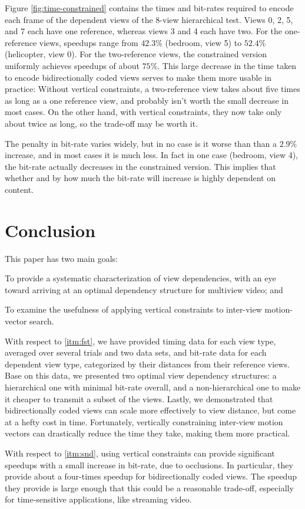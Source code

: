 \documentclass{sig-alternate-05-2015}
\begin{document}
Figure \ref{fig:time-constrained} contains the times and bit-rates required
to encode each frame of the dependent views of the 8-view hierarchical test.
Views 0, 2, 5, and 7 each have one reference, whereas views 3 and 4 each have
two. For the one-reference views, speedups range from $42.3\%$ (bedroom, view
5) to $52.4\%$ (helicopter, view 0). For the two-reference views, the
constrained version uniformly achieves speedups of about $75\%$. This large
decrease in the time taken to encode bidirectionally coded views serves to
make them more usable in practice: Without vertical constraints, a
two-reference view takes about five times as long as a one reference view, and
probably isn't worth the small decrease in most cases. On the other hand, with
vertical constraints, they now take only about twice as long, so the trade-off
may be worth it.

The penalty in bit-rate varies widely, but in no case is it worse than than a
$2.9\%$ increase, and in most cases it is much less. In fact in one case
(bedroom, view 4), the bit-rate actually decreases in the constrained version.
This implies that whether and by how much the bit-rate will increase is highly
dependent on content.
   
\section{Conclusion} %
\label{sec:conclusion} %
This paper has two main goals: \begin{compactenum}
\item \label{itm:fst} To provide a systematic characterization of view
dependencies, with an eye toward arriving at an optimal dependency structure for
multiview video; and
\item \label{itm:snd} To examine the usefulness of applying vertical constraints
to inter-view motion-vector search. \end{compactenum}

With respect to \ref{itm:fst}, we have provided timing data for each view type,
averaged over several trials and two data sets, and bit-rate data for each
dependent view type, categorized by their distances from their reference views.
Base on this data, we presented two optimal view dependency structures: a
hierarchical one with minimal bit-rate overall, and a non-hierarchical one to
make it cheaper to transmit a subset of the views. Lastly, we demonstrated that
bidirectionally coded views can scale more effectively to view distance, but
come at a hefty cost in time. Fortunately, vertically constraining inter-view
motion vectors can drastically reduce the time they take, making them more
practical.

With respect to \ref{itm:snd}, using vertical constraints can provide
significant speedups with a small increase in bit-rate, due to occlusions. 
In particular, they provide about a four-times speedup for bidirectionally
coded views. The speedup they provide is large enough that this could be a
reasonable trade-off, especially for time-sensitive applications, like streaming
video.



\end{document}
